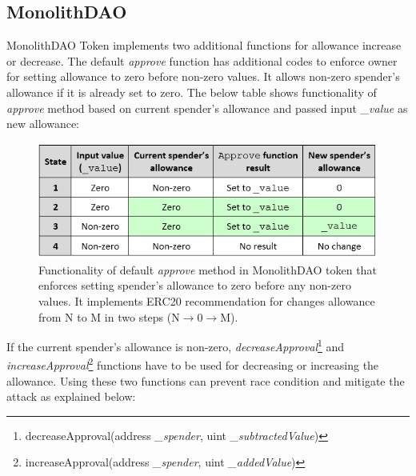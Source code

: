 \subsection{MonolithDAO}
MonolithDAO Token\cite{Ref12} implements two additional functions for allowance increase or decrease. The default \textit{approve} function has additional codes to enforce owner for setting allowance to zero before non-zero values. It allows non-zero spender's allowance if it is already set to zero. The below table shows functionality of \textit{approve} method based on current spender's allowance and passed input \textit{\_value} as new allowance:
\begin{figure}[H]
	\centering
	\includegraphics[width=1.0\linewidth]{figures/multiple_withdrawal_09.png}
	\caption{Functionality of default \textit{approve} method in MonolithDAO token that enforces setting spender's allowance to zero before any non-zero values. It implements ERC20 recommendation for changes allowance from N to M in two steps (N$\rightarrow$0$\rightarrow$M).}
\end{figure}
\noindent If the current spender’s allowance is non-zero, \textit{decreaseApproval}\footnote{decreaseApproval(address \textit{\_spender}, uint \textit{\_subtractedValue})} and \textit{increaseApproval}\footnote{increaseApproval(address \textit{\_spender}, uint \textit{\_addedValue})} functions have to be used for decreasing or increasing the allowance. Using these two functions can prevent race condition and mitigate the attack as explained below:
